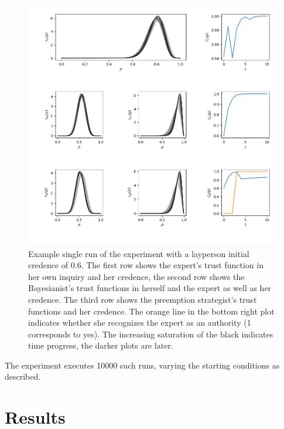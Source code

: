 \documentclass[11pt, a4paper]{scrartcl}
\begin{document}
\begin{figure}
	\centering
\includegraphics[width=\textwidth]{Run.png}
\caption{Example single run of the experiment with a layperson initial credence of $0.6$. The first row shows the expert's trust function in her own inquiry and her credence, the second row shows the Bayesianist's trust functions in herself and the expert as well as her credence. The third row shows the preemption strategist's trust functions and her credence. The orange line in the bottom right plot indicates whether she recognizes the expert as an authority (1 corresponds to yes). The increasing saturation of the black indicates time progress, the darker plots are later.\label{fig:run}}
\end{figure}

The experiment executes 10000 such runs, varying the starting conditions as described.

\section{Results}
\end{document}
